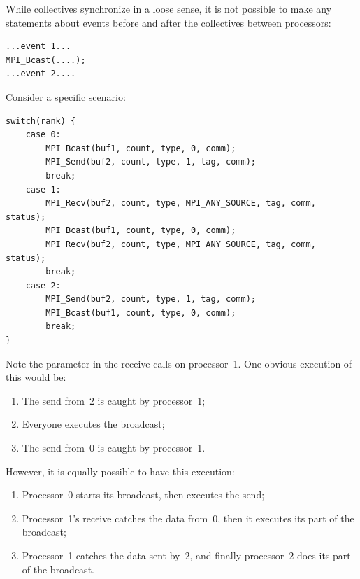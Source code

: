 While collectives synchronize in a loose sense, it is not possible to
make any statements about events before and after the collectives
between processors:
\begin{verbatim}
...event 1...
MPI_Bcast(....);
...event 2....
\end{verbatim}
Consider a specific scenario:
\begin{verbatim}
switch(rank) { 
    case 0: 
        MPI_Bcast(buf1, count, type, 0, comm); 
        MPI_Send(buf2, count, type, 1, tag, comm); 
        break; 
    case 1: 
        MPI_Recv(buf2, count, type, MPI_ANY_SOURCE, tag, comm, status); 
        MPI_Bcast(buf1, count, type, 0, comm); 
        MPI_Recv(buf2, count, type, MPI_ANY_SOURCE, tag, comm, status); 
        break; 
    case 2: 
        MPI_Send(buf2, count, type, 1, tag, comm); 
        MPI_Bcast(buf1, count, type, 0, comm); 
        break; 
}
\end{verbatim}
Note the  parameter in the receive calls on processor~1.
One obvious execution of this would be:
\begin{enumerate}
\item The send from~2 is caught by processor~1;
\item Everyone executes the broadcast;
\item The send from~0 is caught by processor~1.
\end{enumerate}
However, it is equally possible to have this execution:
\begin{enumerate}
\item Processor~0 starts its broadcast, then executes the send;
\item Processor~1's receive catches the data from~0, then it executes
  its part of the broadcast;
\item Processor~1 catches the data sent by~2, and finally processor~2
  does its part of the broadcast.
\end{enumerate}

